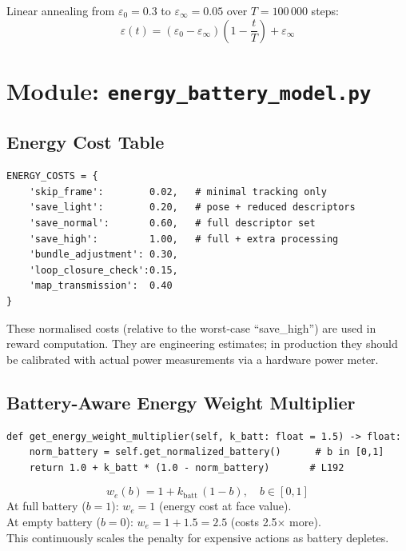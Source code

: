 \documentclass[12pt,a4paper,twoside]{report}
\theoremstyle{definition}
\begin{document}
Linear annealing from $\varepsilon_0 = 0.3$ to $\varepsilon_\infty = 0.05$
over $T = 100\,000$ steps:
\[
  \varepsilon(t) = (\varepsilon_0 - \varepsilon_\infty)\left(1 - \frac{t}{T}\right) + \varepsilon_\infty
\]

\chapter{Module: \texttt{energy\_battery\_model.py}}

\section{Energy Cost Table}

\begin{lstlisting}
ENERGY_COSTS = {
    'skip_frame':        0.02,   # minimal tracking only
    'save_light':        0.20,   # pose + reduced descriptors
    'save_normal':       0.60,   # full descriptor set
    'save_high':         1.00,   # full + extra processing
    'bundle_adjustment': 0.30,
    'loop_closure_check':0.15,
    'map_transmission':  0.40
}
\end{lstlisting}

These normalised costs (relative to the worst-case ``save\_high'') are used in
reward computation. They are engineering estimates; in production they
should be calibrated with actual power measurements via a hardware power meter.

\section{Battery-Aware Energy Weight Multiplier}

\begin{lstlisting}
def get_energy_weight_multiplier(self, k_batt: float = 1.5) -> float:
    norm_battery = self.get_normalized_battery()      # b in [0,1]
    return 1.0 + k_batt * (1.0 - norm_battery)       # L192
\end{lstlisting}

\begin{mathbox}
\[
  w_e(b) = 1 + k_{\text{batt}}\,(1 - b), \quad b \in [0,1]
\]
At full battery ($b=1$): $w_e = 1$ (energy cost at face value).\\
At empty battery ($b=0$): $w_e = 1 + 1.5 = 2.5$ (costs 2.5$\times$ more).\\
This continuously scales the penalty for expensive actions as battery depletes.
\end{mathbox}
\end{document}
